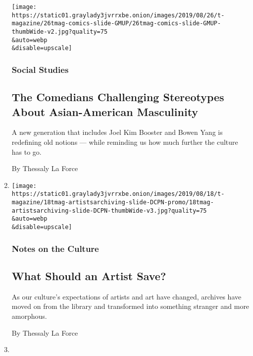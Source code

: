 \begin{enumerate}
  \texttt{[image: https://static01.graylady3jvrrxbe.onion/images/2019/08/26/t-magazine/26tmag-comics-slide-GMUP/26tmag-comics-slide-GMUP-thumbWide-v2.jpg?quality=75\\\&auto=webp\\\&disable=upscale]}

  \hypertarget{social-studies-1}{%
  \subsubsection{Social Studies}\label{social-studies-1}}

  \hypertarget{the-comedians-challenging-stereotypes-about-asian-american-masculinity}{%
  \subsection{The Comedians Challenging Stereotypes About Asian-American
  Masculinity}\label{the-comedians-challenging-stereotypes-about-asian-american-masculinity}}

  A new generation that includes Joel Kim Booster and Bowen Yang is
  redefining old notions --- while reminding us how much further the
  culture has to go.

  By Thessaly La Force
\item
  \href{/2019/08/06/t-magazine/artist-archives.html}{}

  \texttt{[image: https://static01.graylady3jvrrxbe.onion/images/2019/08/18/t-magazine/18tmag-artistsarchiving-slide-DCPN-promo/18tmag-artistsarchiving-slide-DCPN-thumbWide-v3.jpg?quality=75\\\&auto=webp\\\&disable=upscale]}

  \hypertarget{notes-on-the-culture-1}{%
  \subsubsection{Notes on the Culture}\label{notes-on-the-culture-1}}

  \hypertarget{what-should-an-artist-save}{%
  \subsection{What Should an Artist
  Save?}\label{what-should-an-artist-save}}

  As our culture's expectations of artists and art have changed,
  archives have moved on from the library and transformed into something
  stranger and more amorphous.

  By Thessaly La Force
\item
  \href{/2019/07/11/t-magazine/entertainment/lulu-wang-the-farewell-chinese-feast.html}{}


\end{enumerate}
